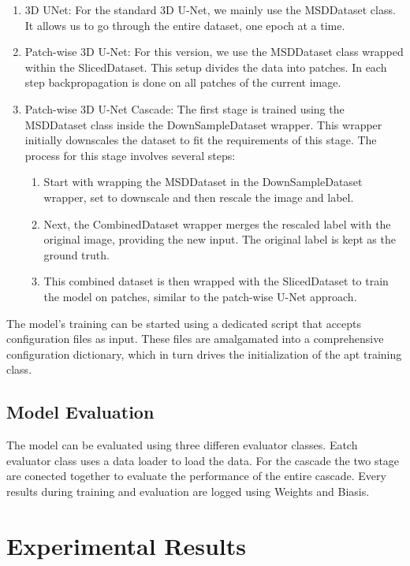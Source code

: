 \begin{enumerate}
	\item 3D UNet: For the standard 3D U-Net, we mainly use the MSDDataset class. It allows us to go through the entire dataset, one epoch at a time.
	\item Patch-wise 3D U-Net: For this version, we use the MSDDataset class wrapped within the SlicedDataset. This setup divides the data into patches.
	In each step backpropagation is done on all patches of the current image.
	\item Patch-wise 3D U-Net Cascade: The first stage is trained using the MSDDataset class inside the DownSampleDataset wrapper. This wrapper initially downscales the dataset to fit the requirements of this stage.
	The process for this stage involves several steps:
	\begin{enumerate}
		\item Start with wrapping the MSDDataset in the DownSampleDataset wrapper, set to downscale and then rescale the image and label.
		\item Next, the CombinedDataset wrapper merges the rescaled label with the original image, providing the new input. The original label is kept as the ground truth.
		\item This combined dataset is then wrapped with the SlicedDataset to train the model on patches, similar to the patch-wise U-Net approach.
	\end{enumerate}
\end{enumerate}

The model's training can be started using a dedicated script that accepts configuration files as input. These files are amalgamated into a comprehensive configuration dictionary,
which in turn drives the initialization of the apt training class.\\[1ex]
\section{Model Evaluation}
The model can be evaluated using three differen evaluator classes. Eatch evaluator class uses a data loader to load the data.
For the cascade the two stage are conected together to evaluate the performance of the entire cascade. Every results during training and evaluation are logged using Weights and Biasis.

\chapter{Experimental Results}

